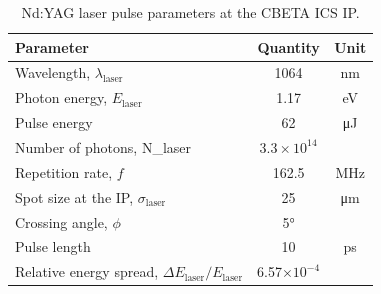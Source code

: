 \documentclass[../main.tex]{subfiles}
\begin{document}
\begin{table}
\caption{Nd:YAG laser pulse parameters at the CBETA ICS IP.}
\vspace{3mm}
\centering
\begin{tabular}{lcc}
\hline\hline
Parameter & Quantity & Unit \\
\hline
Wavelength, $\lambda_\textrm{laser}$ & 1064 & nm\\
Photon energy, $E_\textrm{laser}$ & 1.17 & eV\\
Pulse energy  & 62 & \si{\micro\joule}\\
Number of photons, N_{\textrm{laser}} & $3.3\times 10^{14}$\\ 
Repetition rate, $f$ & 162.5 & MHz\\
Spot size at the IP, $\sigma_\textrm{laser}$ & 25 & \si{\micro\meter}\\
Crossing angle, $\phi$ & \ang{5} &  \\
Pulse length  & 10 & ps\\
Relative energy spread, $\Delta E_\textrm{laser}/E_\textrm{laser}$ & 6.57$\times 10^{-4}$ &   \\
 \hline\hline
\end{tabular}
\label{tab:CBETA_Laser_Pulse_Design_Parameters}
\end{table}
\end{document}

